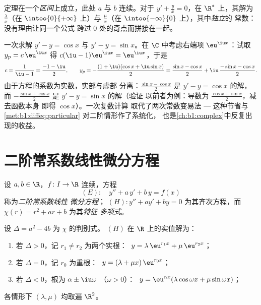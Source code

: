 \begin{remark}[区间不可忽视]
定理在一个\emph{区间}上成立，此处 $a$ 与 $b$
连续。对于 $y' + \frac yx = 0$，在 $\R^*$ 上，其解为
$\frac{\lambda}{x}$（在 $\intoo{0}{+\infty}$ 上）与
$\frac{\mu}{x}$（在 $\intoo{-\infty}{0}$ 上），其中\emph{独立}的
常数：没有理由让同一个公式
跨过 $0$ 处的奇点而拼接在一起。
\end{remark}

\begin{example}\label{ex:b1:diffeq:complexrhs}
一次求解 $y' - y = \cos x$ 与 $y' - y = \sin x$。在
$\C$ 中考虑右端项 $\eu^{\iu x}$：试取 $y_p =
c\,\eu^{\iu x}$ 得 $c(\iu - 1)\eu^{\iu x} = \eu^{\iu x}$，于是
\[
c = \frac1{\iu - 1} = \frac{-1 - \iu}2,
\qquad
y_p = -\frac{(1 + \iu)(\cos x + \iu\sin x)}2
= \frac{\sin x - \cos x}2 + \iu\,\frac{-\sin x - \cos x}2 .
\]
由于方程的系数为实数，实部与虚部
分离：$\frac{\sin x - \cos x}2$ 是 $y' - y = \cos x$ 的解，
而 $-\frac{\sin x + \cos x}2$ 是 $y' - y = \sin x$ 的解（验证
以前者为例：导数为 $\frac{\cos x + \sin x}2$，减去函数本身
即得 $\cos x$）。一次复数计算
取代了两次常数变易法 --- 这种节省与
\cref{met:b1:diffeq:particular} 对二阶情形作了系统化，
也是\cref{ch:b1:complex}中反复出现的收益。
\end{example}

\section{二阶常系数线性微分方程}

\begin{definition}\label{def:b1:diffeq:linear2}
设 $a, b \in \R$，$f \colon I \to \R$ 连续，方程
\[
(E)\colon\quad y'' + a\,y' + b\,y = f(x)
\]
称为\emph{二阶常系数线性
微分方程}；
$(H)\colon y'' + ay' + by = 0$ 为其齐次方程，而
$\chi(r) = r^2 + ar + b$ 为其\emph{特征
多项式}。
\end{definition}

\begin{theorem}[齐次解]\label{thm:b1:diffeq:homogeneous2}
设 $\Delta = a^2 - 4b$ 为 $\chi$ 的判别式。
$(H)$ 在 $\R$ 上的实值解为：
\begin{enumerate}
  \item 若 $\Delta > 0$，记 $r_1 \neq r_2$ 为两个实根：
        $\;y = \lambda\, \eu^{r_1 x} + \mu\, \eu^{r_2 x}$；
  \item 若 $\Delta = 0$，记 $r_0$ 为重根：
        $\;y = (\lambda + \mu x)\, \eu^{r_0 x}$；
  \item 若 $\Delta < 0$，根为 $\alpha \pm \iu\omega$
        （$\omega > 0$）：
        $\;y = \eu^{\alpha x} (\lambda \cos\omega x + \mu
        \sin\omega x)$；
\end{enumerate}
各情形下 $(\lambda, \mu)$ 均取遍 $\R^2$。
\end{theorem}

